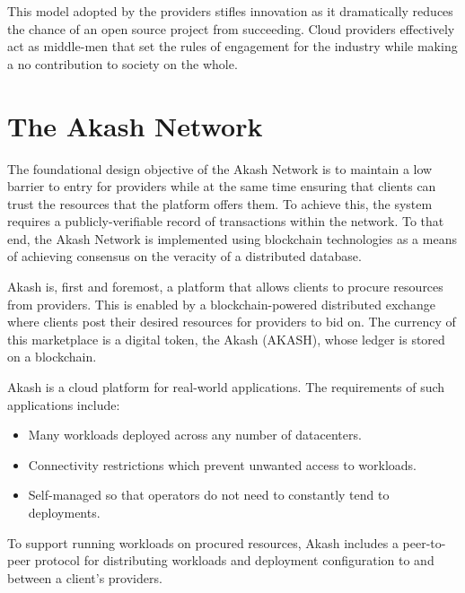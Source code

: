 \documentclass[11pt,english]{article}
\theoremstyle{definition}
\begin{document}
This model adopted by the providers stifles innovation as it dramatically reduces the chance of an open source project from succeeding. Cloud providers effectively act as middle-men that set the rules of engagement for the industry while making a no contribution to society on the whole.


\section{The Akash Network}
The foundational design objective of the Akash Network is to maintain a low barrier to entry for providers while at the same time ensuring that clients can trust the resources that the platform offers them.  To achieve this, the system requires a publicly-verifiable record of transactions within the network. To that end, the Akash Network is implemented using blockchain technologies as a means of achieving consensus on the veracity of a distributed database.

Akash is, first and foremost, a platform that allows clients to procure resources from providers.  This is enabled by a blockchain-powered distributed exchange where clients post their desired resources for providers to bid on. The currency of this marketplace is a digital token, the Akash (AKASH), whose ledger is stored on a blockchain.

Akash is a cloud platform for real-world applications. The requirements of such applications include:

\begin{itemize}
  \item Many workloads deployed across any number of datacenters.
  \item Connectivity restrictions which prevent unwanted access to workloads.
  \item Self-managed so that operators do not need to constantly tend to deployments.
\end{itemize}

To support running workloads on procured resources, Akash includes a peer-to-peer protocol for distributing workloads and deployment configuration to and between a client's providers.
\end{document}
